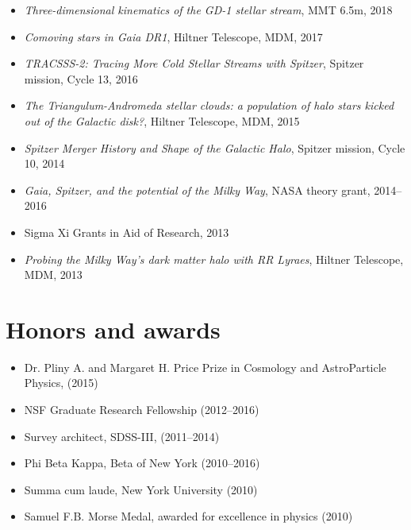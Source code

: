 \documentclass[12pt, letterpaper]{apw-cv}
\begin{document}
	\begin{itemize}
    \item {\it Three-dimensional kinematics of the GD-1 stellar stream}, MMT 6.5m, 2018 %
    \item {\it Comoving stars in Gaia DR1}, Hiltner Telescope, MDM, 2017 %
    \item {\it TRACSSS-2: Tracing More Cold Stellar Streams with Spitzer}, Spitzer mission, Cycle 13, 2016 %
	\item {\it The Triangulum-Andromeda stellar clouds: a population of halo stars kicked out of the Galactic disk?}, Hiltner Telescope, MDM, 2015 %
	\item {\it Spitzer Merger History and Shape of the Galactic Halo}, Spitzer mission, Cycle 10, 2014 %
	\item {\it Gaia, Spitzer, and the potential of the Milky Way}, NASA theory grant, 2014--2016 %
	\item Sigma Xi Grants in Aid of Research, 2013 %
	\item {\it Probing the Milky Way's dark matter halo with RR Lyraes}, Hiltner Telescope, MDM, 2013 %
	\end{itemize}

\section*{Honors and awards}

	\begin{itemize}
    \item Dr. Pliny A. and Margaret H. Price Prize in Cosmology and AstroParticle Physics, (2015)
	\item NSF Graduate Research Fellowship (2012--2016)
	\item Survey architect, SDSS-III, (2011--2014)
	\item Phi Beta Kappa, Beta of New York (2010--2016)
	\item Summa cum laude, New York University (2010)
	\item Samuel F.B. Morse Medal, awarded for excellence in physics (2010)
	\end{itemize}
\end{document}
